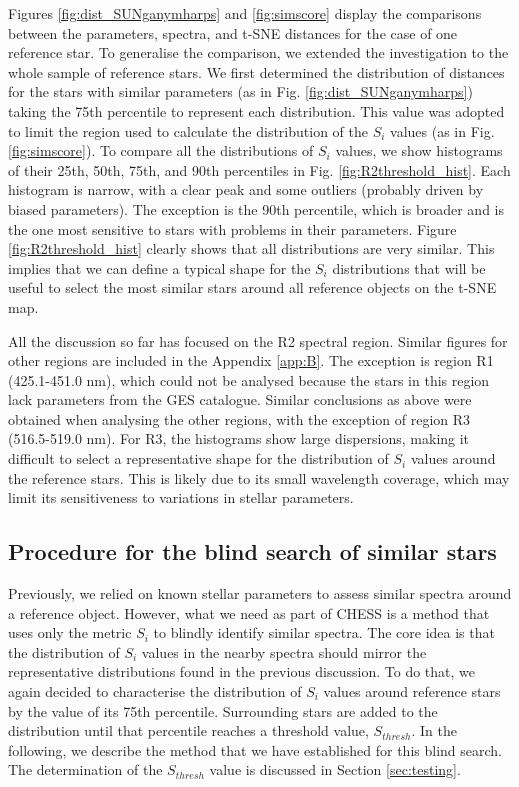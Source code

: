 \documentclass{aa}
\begin{document}
Figures \ref{fig:dist_SUNganymharps} and \ref{fig:simscore} display the comparisons between the parameters, spectra, and t-SNE distances for the case of one reference star. To generalise the comparison, we extended the investigation to the whole sample of reference stars. We first determined the distribution of distances for the stars with similar parameters (as in Fig. \ref{fig:dist_SUNganymharps}) taking the 75th percentile to represent each distribution. This value was adopted to limit the region used to calculate the distribution of the $S_i$ values (as in Fig. \ref{fig:simscore}). To compare all the distributions of $S_i$ values, we show histograms of their 25th, 50th, 75th, and 90th percentiles in Fig. \ref{fig:R2threshold_hist}. Each histogram is narrow, with a clear peak and some outliers (probably driven by biased parameters). The exception is the 90th percentile, which is broader and is the one most sensitive to stars with problems in their parameters. Figure \ref{fig:R2threshold_hist} clearly shows that all distributions are very similar. This implies that we can define a typical shape for the $S_i$ distributions that will be useful to select the most similar stars around all reference objects on the t-SNE map. 

All the discussion so far has focused on the R2 spectral region. Similar figures for other regions are included in the Appendix \ref{app:B}. The exception is region R1 (425.1-451.0 nm), which could not be analysed because the stars in this region lack parameters from the GES catalogue. Similar conclusions as above were obtained when analysing the other regions, with the exception of region R3 (516.5-519.0 nm). For R3, the histograms show large dispersions, making it difficult to select a representative shape for the distribution of $S_{i}$ values around the reference stars. This is likely due to its small wavelength coverage, which may limit its sensitiveness to variations in stellar parameters.

\subsection{Procedure for the blind search of similar stars}\label{sec:blind}

Previously, we relied on known stellar parameters to assess similar spectra around a reference object. However, what we need as part of {\sf CHESS} is a method that uses only the metric $S_i$ to blindly identify similar spectra. The core idea is that the distribution of $S_i$ values in the nearby spectra should mirror the representative distributions found in the previous discussion. To do that, we again decided to characterise the distribution of $S_i$ values around reference stars by the value of its 75th percentile. Surrounding stars are added to the distribution until that percentile reaches a threshold value, $S_{thresh}$. In the following, we describe the method that we have established for this blind search. The determination of the $S_{thresh}$ value is discussed in Section \ref{sec:testing}.
\end{document}
